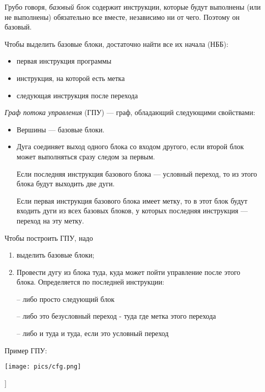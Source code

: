 Грубо говоря, \textit{базовый блок} содержит инструкции, которые будут выполнены (или не выполнены) обязательно все вместе, независимо ни от чего. Поэтому он базовый.

Чтобы выделить базовые блоки, достаточно найти все их начала (НББ):
\begin{itemize}
    \item первая инструкция программы
    \item инструкция, на которой есть метка
    \item следующая инструкция после перехода
\end{itemize}

\textit{Граф потока управления} (ГПУ) --- граф, обладающий следующими свойствами:
\begin{itemize}
    \item Вершины --- базовые блоки.
    \item Дуга соединяет выход одного блока со входом другого, если второй блок может выполняться сразу следом за первым.

    Если последняя инструкция базового блока --- условный переход, то из этого блока будут выходить две дуги.

    Если первая инструкция базового блока имеет метку, то в этот блок будут входить дуги из всех базовых блоков, у которых последняя инструкция --- переход на эту метку.
\end{itemize}

Чтобы построить ГПУ, надо
\begin{enumerate}
    \item выделить базовые блоки;
    \item Провести дугу из блока туда, куда может пойти управление после этого блока. Определяется по последней инструкции:
    \item[--] либо просто следующий блок
    \item[--] либо это безусловный переход - туда где метка этого перехода
    \item[--] либо и туда и туда, если это условный переход
\end{enumerate}

Пример ГПУ:

\texttt{[image: pics/cfg.png]}

\bigbreak
[\cite[slide 7-28]{ssg}]
